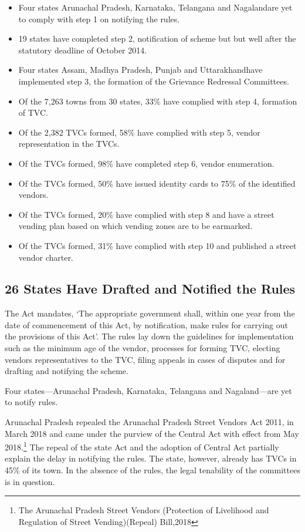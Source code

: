 \documentclass[a4paper, 12pt, twoside, table]{article}
\begin{document}
{\begin{itemize}
	\item Four states \textemdash Arunachal Pradesh, Karnataka, Telangana and Nagaland\textemdash are yet to comply with step 1 on notifying the rules.
	\item 19 states have completed step 2, notification of scheme but but well after the statutory deadline of October 2014.
	\item Four states \textemdash  Assam, Madhya Pradesh, Punjab and Uttarakhand\textemdash have implemented step 3, the formation of the Grievance Redressal Committees.
	\item Of the 7,263 towns from 30 states, 33\% have complied with step 4, formation of TVC.
	\item Of the 2,382 TVCs formed, 58\% have complied with step 5, vendor representation in the TVCs.
	\item Of the TVCs formed, 98\% have completed step 6, vendor enumeration.
	\item Of the TVCs formed, 50\% have issued identity cards to 75\% of the identified vendors.
	\item Of the TVCs formed, 20\% have complied with step 8 and have a street vending plan based on which vending zones are to be earmarked. 
	\item Of the TVCs formed, 31\% have complied with step 10 and published a street vendor charter.
\end{itemize}

\subsection*{26 States Have Drafted and Notified the Rules}
	The Act mandates, `The appropriate government shall, within one year from the date of commencement of this Act, by notification, make rules for carrying out the provisions of this Act'. The rules lay down the guidelines for implementation such as the minimum age of the vendor, processes for forming TVC, electing vendors representatives to the TVC, filing appeals in cases of disputes and for drafting and notifying the scheme.

	Four states—Arunachal Pradesh, Karnataka, Telangana and Nagaland—are yet to notify rules.

	Arunachal Pradesh repealed the Arunachal Pradesh Street Vendors Act 2011, in March 2018 and came under the purview of the Central Act with effect from May 2018.\footnote{ The Arunachal Pradesh Street Vendors (Protection of Livelihood and Regulation of Street Vending)(Repeal) Bill,2018} The repeal of the state Act and the adoption of Central Act partially explain the delay in notifying the rules. The state, however, already has TVCs in 45\% of its town. In the absence of the rules, the legal tenability of the committees is in question.

}
\end{document}
